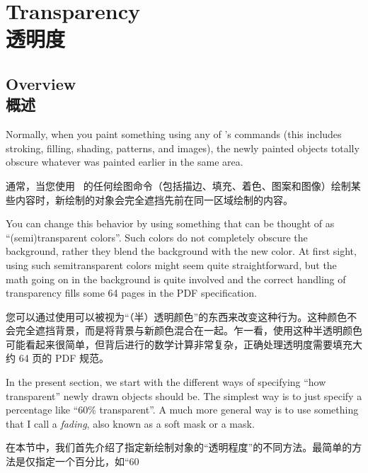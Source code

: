 \setcounter{section}{22}
\setcounter{subsection}{8}
\setcounter{subsubsection}{0}
%
%
%


\section{Transparency\\透明度}
\label{section-tikz-transparency}

\subsection{Overview\\概述}

Normally, when you paint something using any of \tikzname's commands (this
includes stroking, filling, shading, patterns, and images), the newly painted
objects totally obscure whatever was painted earlier in the same area.

通常，当您使用 \tikzname\ 的任何绘图命令（包括描边、填充、着色、图案和图像）绘制某些内容时，新绘制的对象会完全遮挡先前在同一区域绘制的内容。

You can change this behavior by using something that can be thought of as
``(semi)transparent colors''. Such colors do not completely obscure the
background, rather they blend the background with the new color. At first
sight, using such semitransparent colors might seem quite straightforward, but
the math going on in the background is quite involved and the correct handling
of transparency fills some 64 pages in the PDF specification.

您可以通过使用可以被视为“（半）透明颜色”的东西来改变这种行为。这种颜色不会完全遮挡背景，而是将背景与新颜色混合在一起。乍一看，使用这种半透明颜色可能看起来很简单，但背后进行的数学计算非常复杂，正确处理透明度需要填充大约 64 页的 PDF 规范。

In the present section, we start with the different ways of specifying ``how
transparent'' newly drawn objects should be. The simplest way is to just
specify a percentage like ``60\% transparent''. A much more general way is to
use something that I call a \emph{fading}, also known as a soft mask or a mask.

在本节中，我们首先介绍了指定新绘制对象的“透明程度”的不同方法。最简单的方法是仅指定一个百分比，如“60%

